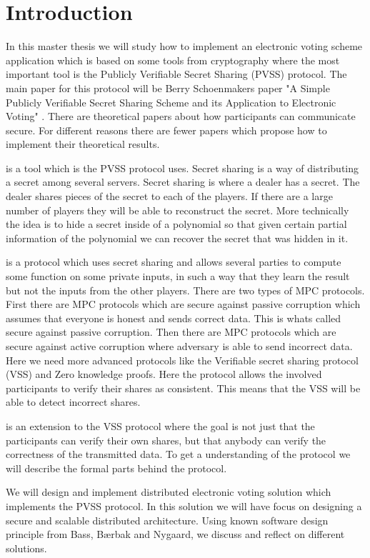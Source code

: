 \section{Introduction}
In this master thesis we will study how to implement an  electronic voting scheme application which is based on some tools from cryptography where the most important tool is the Publicly Verifiable Secret Sharing (PVSS) protocol. The main paper for this protocol will be Berry Schoenmakers paper "A Simple Publicly Verifiable Secret Sharing Scheme and its Application to Electronic Voting" \cite{Schoenmakers1999}. There are theoretical papers about how participants can communicate secure. For different reasons there are fewer papers which propose how to implement their theoretical results. 

 is a tool which is the PVSS protocol uses. Secret sharing is a way of distributing a secret among several servers. Secret sharing is where a dealer has a secret. The dealer shares pieces of the secret to each of the players. If there are a large number of players they will be able to reconstruct the secret. More technically the idea is to hide a secret inside of a polynomial so that given certain partial information of the polynomial we can recover the secret that was hidden in it.

 is a protocol which uses secret sharing and allows several parties to compute some function on some private inputs, in such a way that they learn the result but not the inputs from the other players. There are two types of MPC protocols. First there are MPC protocols which are secure against passive corruption which assumes that everyone is honest and sends correct data. This is whats called secure against passive corruption. Then there are MPC protocols which are secure against active corruption where adversary is able to send incorrect data. Here we need more advanced protocols like the Verifiable secret sharing protocol (VSS) and Zero knowledge proofs. Here the protocol allows the involved participants to verify their shares as consistent. This means that the VSS will be able to detect incorrect shares.

 is an extension to the VSS protocol where the goal is not just that the participants can verify their own shares, but that anybody can verify the correctness of the transmitted data. To get a understanding of the protocol we will describe the formal parts behind the protocol. 

 We will design and implement distributed electronic voting solution which implements the PVSS protocol. In this solution we will have focus on designing a secure and scalable distributed architecture. Using known software design principle from Bass, Bærbak and Nygaard, we discuss and reflect on different solutions.

